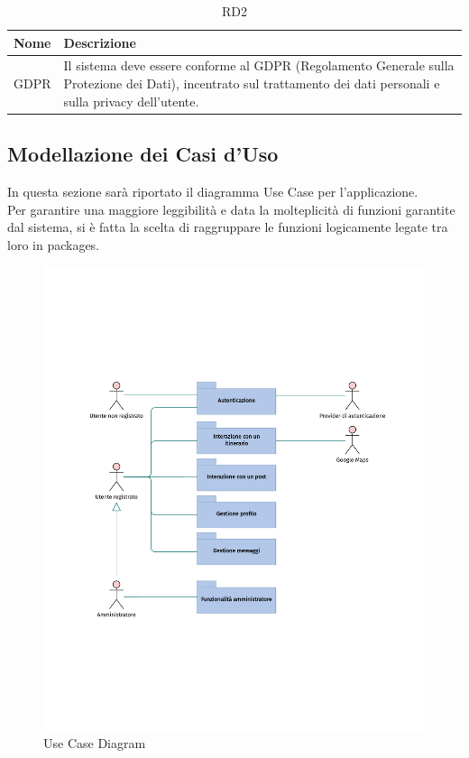 \documentclass{natourDoc}
\begin{document}
\begin{table}[H]
	\centering
	\begin{tabular}{ |p{5cm}|p{10.3cm}| }
		\hline
		\rowcolor{PineGreen!70}
		\textbf{Nome} & \textbf{Descrizione}                                                                      \\
		\hline
		GDPR          & Il sistema deve essere conforme al GDPR (Regolamento Generale sulla Protezione dei Dati),
		incentrato sul trattamento dei dati personali e sulla privacy dell’utente.                                \\
		\hline
	\end{tabular}
	\caption{RD2}
	\label{table:29}
\end{table}

\newpage

\newpage
\subsection{Modellazione dei Casi d'Uso}
In questa sezione sarà riportato il diagramma Use Case per l'applicazione.\\
Per garantire una maggiore leggibilità e data la molteplicità di funzioni garantite
dal sistema, si è fatta la scelta di raggruppare le funzioni logicamente legate
tra loro in packages.

\begin{figure}[!htbp]
	\centering
	\includegraphics[width=\textwidth, page=1]{./diagrams/useCase.pdf}
	\caption{Use Case Diagram}
\end{figure}
\FloatBarrier
\end{document}
